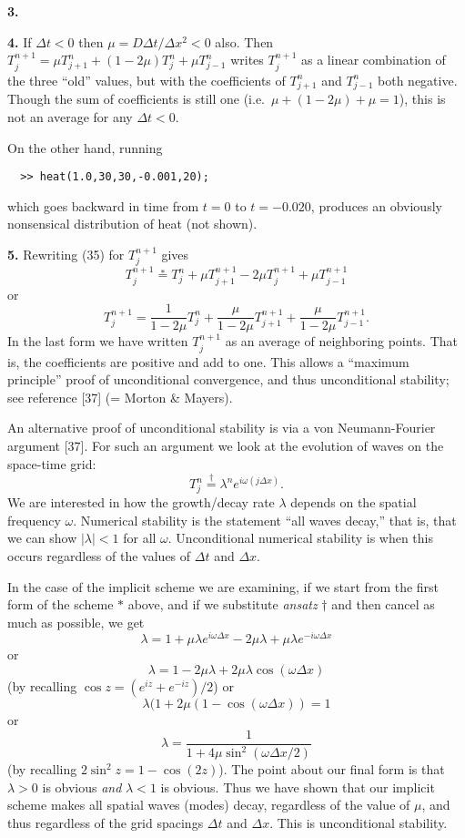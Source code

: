 \documentclass[10pt]{amsart}
\newcommand{\mfile}[1]{
\begin{quote}
\bigskip
\VerbatimInput[frame=single,label=\fbox{\normalsize \textsl{\,#1\,}},fontfamily=courier,fontsize=\footnotesize]{#1}
\end{quote}
}
\newcommand{\prob}[1]{\bigskip\noindent\large\textbf{#1.}\normalsize }
\begin{document}
\prob{3}

\mfile{heatwithloops.m}

\prob{4}  If $\Delta t < 0$ then $\mu = D \Delta t / \Delta x^2 < 0$ also.  Then $T_j^{n+1} = \mu T_{j+1}^n + (1 - 2 \mu) T_j^n + \mu T_{j-1}^n$ writes $T_j^{n+1}$ as a linear combination of the three ``old'' values, but with the coefficients of $T_{j+1}^n$ and $T_{j-1}^n$ both negative.  Though the sum of coefficients is still one (i.e.~$\mu + (1-2\mu) + \mu = 1$), this is not an average for any $\Delta t < 0$.

On the other hand, running
\begin{verbatim}
  >> heat(1.0,30,30,-0.001,20);
\end{verbatim}
which goes backward in time from $t=0$ to $t=-0.020$, produces an obviously nonsensical distribution of heat (not shown).

\prob{5}  Rewriting (35) for $T_j^{n+1}$ gives
    $$T_j^{n+1} \stackrel{\ast}{=} T_j^n + \mu T_{j+1}^{n+1} - 2 \mu T_j^{n+1} + \mu T_{j-1}^{n+1}$$
or
    $$T_j^{n+1} = \frac{1}{1 - 2\mu} T_j^n + \frac{\mu}{1 - 2\mu} T_{j+1}^{n+1} + \frac{\mu}{1 - 2\mu} T_{j-1}^{n+1}.$$
In the last form we have written $T_j^{n+1}$ as an average of neighboring points.  That is, the coefficients are positive and add to one.  This allows a ``maximum principle'' proof of unconditional convergence, and thus unconditional stability; see reference [37] (= Morton \& Mayers).

An alternative proof of unconditional stability is via a von Neumann-Fourier argument [37].  For such an argument we look at the evolution of waves on the space-time grid:
    $$T_j^n \stackrel{\dagger}{=} \lambda^n e^{i\omega (j\Delta x)}.$$
We are interested in how the growth/decay rate $\lambda$ depends on the spatial frequency $\omega$.  Numerical stability is the statement ``all waves decay,'' that is, that we can show $|\lambda|<1$ for all $\omega$.  Unconditional numerical stability is when this occurs regardless of the values of $\Delta t$ and $\Delta x$.

In the case of the implicit scheme we are examining, if we start from the first form of the scheme $\ast$ above, and if we substitute \emph{ansatz} $\dagger$ and then cancel as much as possible, we get
    $$\lambda = 1 + \mu \lambda e^{i\omega\Delta x} - 2 \mu \lambda + \mu \lambda e^{-i\omega\Delta x}$$
or
    $$\lambda = 1 - 2 \mu \lambda + 2 \mu \lambda \cos(\omega\Delta x)$$
(by recalling $\cos z = (e^{iz} + e^{-iz}) / 2$) or
    $$\lambda (1 + 2\mu (1 - \cos(\omega\Delta x)) = 1$$
or
    $$\lambda = \frac{1}{1 + 4 \mu \sin^2(\omega\Delta x/2)}$$
(by recalling $2 \sin^2 z = 1-\cos(2z)$).  The point about our final form is that $\lambda > 0$ is obvious \emph{and} $\lambda < 1$ is obvious.  Thus we have shown that our implicit scheme makes all spatial waves (modes) decay, regardless of the value of $\mu$, and thus regardless of the grid spacings $\Delta t$ and $\Delta x$.  This is unconditional stability.
\end{document}
